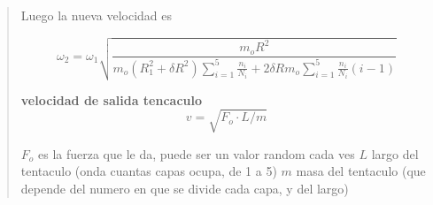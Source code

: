 \documentclass[a4paper, 10pt]{article}
\begin{document}
\begin{quote}
Luego la nueva velocidad es


$$\omega_2 = \omega_1 \sqrt{\frac{m_oR^2}{m_o(R_1^2 +\delta R^2)\sum_{i=1}^5\frac{n_i}{ N_i} + 2 \delta Rm_o \sum_{i=1}^5 \frac{n_i}{N_i}(i-1)}}$$

\textbf{velocidad de salida tencaculo}
$$v= \sqrt{F_o\cdot L / m} $$

$F_o$ es la fuerza que le da, puede ser un valor random cada ves
$L$ largo del tentaculo (onda cuantas capas ocupa, de 1 a 5)
$m$ masa del tentaculo (que depende del numero en que se divide cada capa, y del largo)








\end{quote}
\end{document}
